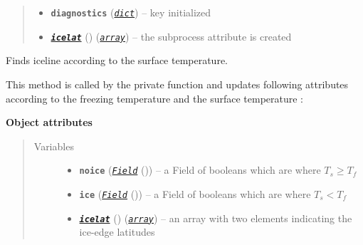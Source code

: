 \documentclass[a4paper,10pt,english]{sphinxmanual}
\begin{document}
\begin{fulllineitems}
\begin{quote}
\begin{description}
\begin{itemize}
\item {} 
\textbf{\texttt{diagnostics}} (\href{http://docs.python.org/2.7/library/stdtypes.html\#dict}{\emph{\texttt{dict}}}) -- key  initialized

\item {} 
{\hyperref[api/climlab.surface:climlab.surface.albedo.Iceline.icelat]{\emph{\textbf{\texttt{icelat}}}}} () (\href{http://docs.python.org/2.7/library/array.html\#module-array}{\emph{\texttt{array}}}) -- the subprocess attribute  is
created

\end{itemize}

\end{description}\end{quote}

\begin{fulllineitems}
\label{api/climlab.surface:climlab.surface.albedo.Iceline.find_icelines}
Finds iceline according to the surface temperature.

This method is called by the private function 
and updates following attributes according to the freezing temperature
 and the surface temperature :

\textbf{Object attributes}
\begin{quote}\begin{description}
\item[{Variables}] \leavevmode\begin{itemize}
\item {} 
\textbf{\texttt{noice}} ({\hyperref[api/climlab.domain:climlab.domain.field.Field]{\emph{\emph{\texttt{Field}}}}} ()) -- a Field of booleans which are  where
\(T_s \ge T_f\)

\item {} 
\textbf{\texttt{ice}} ({\hyperref[api/climlab.domain:climlab.domain.field.Field]{\emph{\emph{\texttt{Field}}}}} ()) -- a Field of booleans which are  where
\(T_s < T_f\)

\item {} 
{\hyperref[api/climlab.surface:climlab.surface.albedo.Iceline.icelat]{\emph{\textbf{\texttt{icelat}}}}} () (\href{http://docs.python.org/2.7/library/array.html\#module-array}{\emph{\texttt{array}}}) -- an array with two elements indicating the 
ice-edge latitudes


\end{itemize}
\end{description}
\end{quote}
\end{fulllineitems}
\end{fulllineitems}
\end{document}

